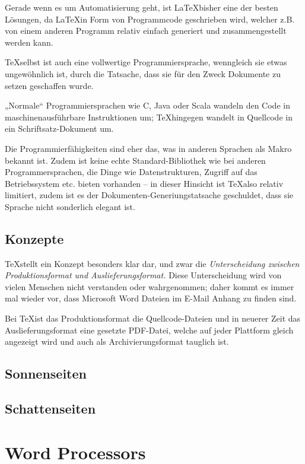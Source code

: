 Gerade wenn es um Automatisierung geht, ist \LaTeX bisher eine der besten
Lösungen, da \LaTeX in Form von Programmcode geschrieben wird, welcher
z.B. von einem anderen Programm relativ einfach generiert und zusammengestellt
werden kann.

\TeX selbst ist auch eine vollwertige Programmiersprache, wenngleich sie
etwas ungewöhnlich ist, durch die Tatsache, dass sie für den Zweck
Dokumente zu setzen geschaffen wurde.

„Normale“ Programmiersprachen wie C, Java oder Scala wandeln den Code in
maschinenausführbare Instruktionen um; \TeX hingegen wandelt in Quellcode
in ein Schriftsatz-Dokument um. %

Die Programmierfähigkeiten sind eher das, was in anderen Sprachen
als Makro bekannt ist. Zudem ist keine echte Standard-Bibliothek wie
bei anderen Programmersprachen, die Dinge wie Datenstrukturen, Zugriff auf
das Betriebssystem etc. bieten vorhanden -- in dieser Hinsicht ist \TeX also
relativ limitiert, zudem ist es der Dokumenten-Generiungstatsache geschuldet,
dass sie Sprache nicht sonderlich elegant ist.

\subsection{Konzepte}

\TeX stellt ein Konzept besonders klar dar, und zwar die \emph{Unterscheidung
zwischen Produktionsformat und Auslieferungsformat.} Diese Unterscheidung
wird von vielen Menschen nicht verstanden oder wahrgenommen; daher kommt
es immer mal wieder vor, dass Microsoft Word Dateien im E-Mail Anhang zu
finden sind.

Bei \TeX ist das Produktionsformat die Quellcode-Dateien und in neuerer
Zeit das Auslieferungsformat eine gesetzte PDF-Datei, welche auf jeder
Plattform gleich angezeigt wird und auch als Archivierungsformat tauglich
ist.

\subsection{Sonnenseiten}

\subsection{Schattenseiten}

\section{Word Processors}


